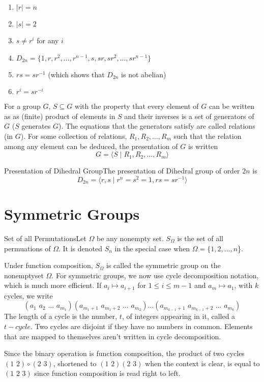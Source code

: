 \documentclass{report}
\newcommand{\mprop}[2]{\begin{Prop}{#1}{}#2\end{Prop}}
\newcommand{\ex}[2]{\begin{Example}{#1}{}#2\end{Example}}
\newcommand{\dfn}[2]{\begin{Definition}[colbacktitle=red!75!black]{#1}{}#2\end{Definition}}
\newcommand{\nt}[1]{\begin{note}#1\end{note}}
\begin{document}
\mprop{}{\begin{enumerate}
    \item $|r| = n$
    \item $|s| = 2$
    \item $s \neq r^i$ for any $i$
    \item $D_{2n} = \{1, r, r^2, \dots , r^{n-1} , s, sr, sr^2, \dots, sr^{n-1} \}$
    \item $rs = sr^{-1}$ (which shows that $D_{2n}$ is not abelian)
    \item $r^i = sr^{-i}$
\end{enumerate}}
For a group $G$, $S \subseteq G$ with the property that every element of $G$ can be written as as (finite) product of elements in $S$ and their inverses is a set of generators of $G$ ($S$ generates $G$). The equations that the generators satisfy are called relations (in $G$). For some collection of relations, $R_1 , R_2 , \dots , R_m$ such that the relation among any element can be deduced, the presentation of $G$ is written
$$G = \langle S \mid R_1, R_2, \dots, R_m \rangle$$
\ex{Presentation of Dihedral Group}{The presentation of Dihedral group of order $2n$ is $$D_{2n} = \langle r,s \mid r^n = s^2 = 1, rs = sr^{-1}\rangle$$}

\section{Symmetric Groups}
\dfn{Set of all Permutations}{Let $\Omega$ be any nonempty set. $S_\Omega$ is the set of all permuations of $\Omega$. It is denoted $S_n$ in the special case when $\Omega = \{1, 2, \dots, n$\}.}
Under function composition, $S_\Omega$ is called the symmetric group on the nonemptyset $\Omega$. For symmetric groups, we now use cycle decomposition notation, which is much more efficient. If $a_i \mapsto a_{i+1}$ for $1 \leq i \leq m-1$ and $a_m \mapsto a_1$, with $k$ cycles, we write $$(a_1 \hspace{4pt} a_2 \hspace{4pt}\dots \hspace{4pt} a_{m_1})(a_{m_1 +1} \hspace{4pt} a_{m_1 +2} \hspace{4pt}\dots \hspace{4pt} a_{m_2})\dots(a_{m_{k-1}+1} \hspace{4pt} a_{m_{k-1}+2} \hspace{4pt}\dots \hspace{4pt} a_{m_k})$$
The length of a cycle is the number, $t$, of integers appearing in it, called a $t-cycle$. Two cycles are disjoint if they have no numbers in common. Elements that are mapped to themselves aren't written in cycle decomposition. 
\nt{Since the binary operation is function composition, the product of two cycles $(1 \hspace{4pt} 2) \circ (2 \hspace{4pt} 3)$, shortened to $(1 \hspace{4pt} 2) (2 \hspace{4pt} 3)$ when the context is clear, is equal to $(1 \hspace{4pt} 2 \hspace{4pt} 3)$ since function composition is read right to left.}
\end{document}
